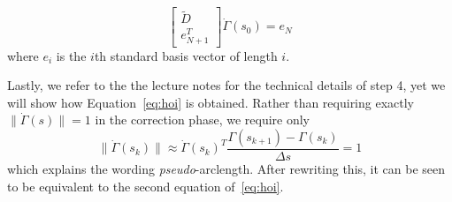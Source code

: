 \begin{equation}
  \begin{bmatrix}
    \tilde{D} \\ e_{N+1}^T
  \end{bmatrix}
  \dot\Gamma(s_0)
  =
  e_{N}
\end{equation}
where $e_{i}$ is the $i$th standard basis vector of length $i.$ 

Lastly, we refer to the the lecture notes for the technical details of step 4, yet we will show how Equation~\eqref{eq:hoi} is obtained. Rather than requiring exactly $\|\dot\Gamma(s)\| = 1$ in the correction phase, we require only
\begin{equation}
  \|\dot\Gamma(s_k)\| \approx \dot\Gamma(s_k)^T \frac{\Gamma(s_{k+1}) - \Gamma(s_k)}{\Delta s} = 1
\end{equation}
which explains the wording {\em pseudo}-arclength. After rewriting this, it can be seen to be equivalent to the second equation of~\eqref{eq:hoi}.